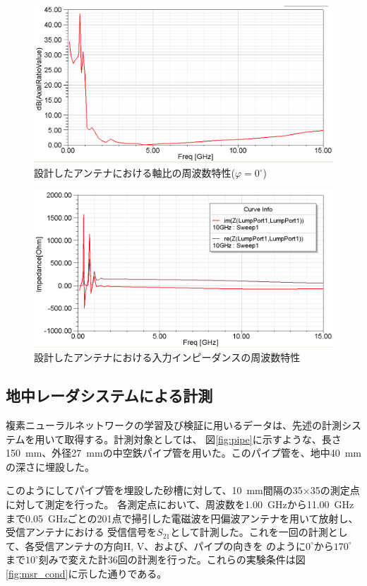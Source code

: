 \documentclass[11pt,a4paper,uplatex]{ujarticle}
\begin{document}
  \begin{figure}[hbtp]
    \centering
    \includegraphics[keepaspectratio, width=130mm]{Images/axial_ratio_ver2.png}
    \caption{設計したアンテナにおける軸比の周波数特性($\varphi = 0^\circ$)}
    \label{fig:axial_ratio}
  \end{figure}

  \begin{figure}[hbtp]
    \centering
    \includegraphics[keepaspectratio, width=130mm]{Images/antenna_impedance_ver2.png}
    \caption{設計したアンテナにおける入力インピーダンスの周波数特性}
    \label{fig:spiral_antenna_impedance}
  \end{figure}

\newpage

  \subsection{地中レーダシステムによる計測}
  複素ニューラルネットワークの学習及び検証に用いるデータは、先述の計測システムを用いて取得する。計測対象としては、
  図\ref{fig:pipe}に示すような、長さ150~mm、外径27~mmの中空鉄パイプ管を用いた。このパイプ管を、地中40~mmの深さに埋設した。

  このようにしてパイプ管を埋設した砂槽に対して、10~mm間隔の35×35の測定点に対して測定を行った。
  各測定点において、周波数を1.00~GHzから11.00~GHzまで0.05~GHzごとの201点で掃引した電磁波を円偏波アンテナを用いて放射し、受信アンテナにおける
  受信信号を$S_{21}$として計測した。これを一回の計測として、各受信アンテナの方向H, V、および、パイプの向きを
  のように$0^{\circ}$から$170^{\circ}$まで$10^{\circ}$刻みで変えた計36回の計測を行った。これらの実験条件は図\ref{fig:msr_cond}に示した通りである。
\end{document}
